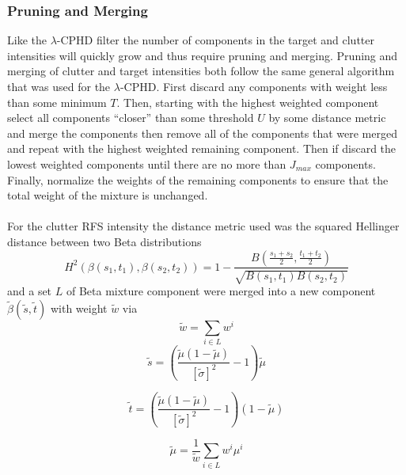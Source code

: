 \documentclass{article}
\begin{document}
\subsubsection{Pruning and Merging}
Like the $\lambda$-CPHD filter the number of components in the target and clutter intensities will quickly grow and thus require pruning and merging. Pruning and merging of clutter and target intensities both follow the same general algorithm that was used for the $\lambda$-CPHD. First discard any components with weight less than some minimum $T$. Then, starting with the highest weighted component select all components ``closer'' than some threshold $U$ by some distance metric and merge the components then remove all of the components that were merged and repeat with the highest weighted remaining component. Then if discard the lowest weighted components until there are no more than $J_{max}$ components. Finally, normalize the weights of the remaining components to ensure that the total weight of the mixture is unchanged.\\
\\
For the clutter RFS intensity the distance metric used was the squared Hellinger distance between two Beta distributions
\begin{equation}
  \label{eq:hellinger_beta}
  H^2\left( \beta(s_1,t_1),\beta(s_2,t_2)\right) = 1 - \frac{B\left( \frac{s_1+s_2}{2},\frac{t_1+t_2}{2}\right)}{\sqrt{B(s_1,t_1)B(s_2,t_2)}}
\end{equation}
and a set $L$ of Beta mixture component were merged into a new component $\tilde{\beta}(\tilde{s},\tilde{t})$ with weight $\tilde{w}$ via
\begin{equation}
  \label{eq:beta_merge_w}
  \tilde{w} = \sum_{i \in L}w^i
\end{equation}
\begin{equation}
  \label{eq:beta_merge_s}
  \tilde{s} = \left( \frac{ \tilde{\mu} \left( 1 - \tilde{\mu} \right) }
    { \left[ \tilde{\sigma} \right]^2  } -1 \right)  \tilde{\mu}
\end{equation}

\begin{equation}
  \label{eq:beta_merge_t}
  \tilde{t} = \left( \frac{ \tilde{\mu} \left( 1 - \tilde{\mu} \right) }
    { \left[ \tilde{\sigma} \right]^2  } -1 \right)  \left( 1-\tilde{\mu} \right)
\end{equation}

\begin{equation}
  \label{eq:beta_mu_merge}
  \tilde{\mu} = \frac{ 1 }{\tilde{w}}\sum_{i \in L}w^i\mu^i
\end{equation}
\end{document}
